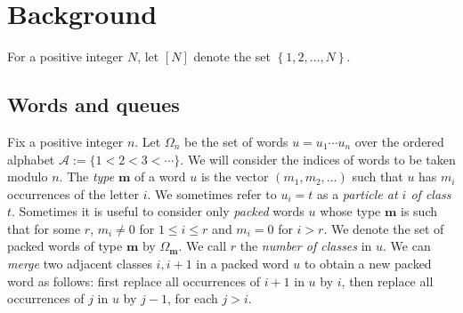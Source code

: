 \documentclass[reqno]{amsart}
\newcommand{\mbf}{\mathbf}
\newcommand{\0}{\phantom{c}}
\newcommand{\mm}{\mathbf{m}}
\newcommand{\mcA}{\mathcal{A}}
\newcommand{\set}[1]{\left\{ #1 \right\}}
\newcommand{\ive}[1]{\left[ #1 \right]}
\newcommand{\defn}[1]{{\color{darkred}\emph{#1}}} %
\theoremstyle{plain}
\theoremstyle{definition}
\numberwithin{equation}{section}
\newcommand{\Erik}[1]{\todo[size=\tiny,inline,color=green!30]{#1
      \\ \hfill --- Erik}}
\newcommand{\darij}[1]{\todo[size=\tiny,color=red!30]{#1 \\ \hfill --- Darij}}
\begin{document}
%









\section{Background}
\label{sec:background}

For a positive integer $N$, let $\ive{N}$ denote the set $\set{1, 2, \ldots, N}$.

\subsection{Words and queues}

Fix a positive integer $n$.
Let $\Omega_n$ be the set of words $u = u_1 \dotsm u_n$ over the ordered alphabet $\mcA := \{1 < 2 < 3 < \cdots \}$.
We will consider the indices of words to be taken modulo $n$. 
The \defn{type} $\mm$ of a word $u$ is the vector $(m_1, m_2, \ldots)$ such that $u$ has $m_i$ occurrences of the letter $i$.
We sometimes refer to $u_i = t$ as a \defn{particle at $i$ of class $t$}.
Sometimes it is useful to consider only \defn{packed} words $u$ whose type $\mm$ is such that for some $r$, $m_i \neq 0$ for $1 \leq i \leq r$ and $m_i = 0$ for $i > r$. We denote the set of packed words of type $\mbf{m}$ by $\Omega_{\mbf{m}}$.
We call $r$ the \defn{number of classes} in $u$.
We can \defn{merge} two adjacent classes $i,i+1$ in a packed word $u$ to obtain a new packed word as follows: first replace all occurrences of $i+1$ in $u$ by $i$, then replace all occurrences of $j$ in $u$ by $j-1$, for each $j > i$.
\end{document}
